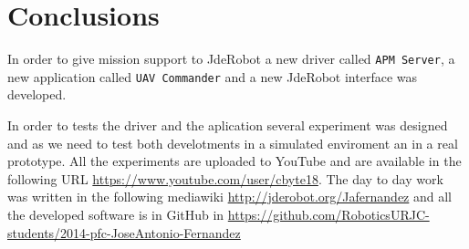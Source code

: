 \documentclass{llncs}
\begin{document}
\section{Conclusions}

In order to give mission support to JdeRobot a new driver called \texttt{APM Server}, a new application called \texttt{UAV Commander} and a new JdeRobot interface was developed.

In order to tests the driver and the aplication several experiment was designed and as we need to test both develotments in a simulated enviroment an in a real prototype. All the experiments are uploaded to YouTube and are available in the following URL \url{https://www.youtube.com/user/cbyte18}. The day to day work was written in the following mediawiki \url{http://jderobot.org/Jafernandez} and all the developed software is in GitHub in \url{https://github.com/RoboticsURJC-students/2014-pfc-JoseAntonio-Fernandez}
\end{document}
